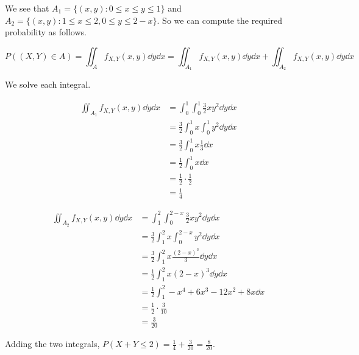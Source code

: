 \begin{example}[]
\begin{center}
	\end{center}

	We see that $A_1=\{(x,y):0\leq x\leq y\leq 1\}$ and $A_2=\{(x,y):1\leq x\leq 2,0\leq y\leq 2-x\}$. So we can compute the required probability as follows.

	$$P((X,Y)\in A)=\iint_Af_{X,Y}(x,y)\dd y\dd x=\iint_{A_1}f_{X,Y}(x,y)\dd y\dd x+\iint_{A_2}f_{X,Y}(x,y)\dd y\dd x$$

	We solve each integral.

	\begin{align*}
	\iint_{A_1}f_{X,Y}(x,y)\dd y\dd x&=\int_0^1\int_0^1\frac 32xy^2\dd y\dd x\\
		&=\frac 32\int_0^1x\int_0^1y^2\dd y\dd x\\
		&=\frac 32\int_0^1x\frac 13\dd x\\
		&=\frac 12\int_0^1x\dd x\\
		&=\frac 12\cdot\frac 12\\
		&=\frac 14
	\end{align*}

	\begin{align*}
		\iint_{A_2}f_{X,Y}(x,y)\dd y\dd x&=\int_1^2\int_{0}^{2-x}\frac 32xy^2\dd y\dd x\\
		&=\frac 32\int_1^2x\int_{0}^{2-x}y^2\dd y\dd x\\
		&=\frac 32\int_1^2x\frac{(2-x)^3}{3}\dd y\dd x\\
		&=\frac 12\int_1^2x (2-x)^3\dd y\dd x\\
		&=\frac 12\int_1^2-x^4+6x^3-12x^2+8x\dd x\\
		&=\frac 12\cdot\frac 3{10}\\
		&=\frac 3{20}
	\end{align*}

	Adding the two integrals, $P(X+Y\leq 2)=\frac 14+\frac 3{20}=\frac 8{20}$.
\end{example}

